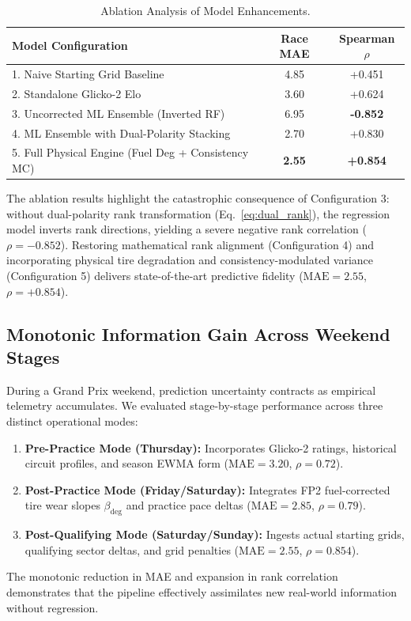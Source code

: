 \begin{table}[ht]
\centering
\caption{Ablation Analysis of Model Enhancements.}
\label{tab:ablation_study}
\begin{tabular}{lcc}
\toprule
\textbf{Model Configuration} & \textbf{Race MAE} & \textbf{Spearman $\rho$} \\
\midrule
1. Naive Starting Grid Baseline & 4.85 & +0.451 \\
2. Standalone Glicko-2 Elo & 3.60 & +0.624 \\
3. Uncorrected ML Ensemble (Inverted RF) & 6.95 & \textbf{-0.852} \\
4. ML Ensemble with Dual-Polarity Stacking & 2.70 & +0.830 \\
5. Full Physical Engine (Fuel Deg + Consistency MC) & \textbf{2.55} & \textbf{+0.854} \\
\bottomrule
\end{tabular}
\end{table}

The ablation results highlight the catastrophic consequence of Configuration 3: without dual-polarity rank transformation (Eq.~\eqref{eq:dual_rank}), the regression model inverts rank directions, yielding a severe negative rank correlation ($\rho = -0.852$). Restoring mathematical rank alignment (Configuration 4) and incorporating physical tire degradation and consistency-modulated variance (Configuration 5) delivers state-of-the-art predictive fidelity ($\text{MAE} = 2.55$, $\rho = +0.854$).

\subsection{Monotonic Information Gain Across Weekend Stages}
During a Grand Prix weekend, prediction uncertainty contracts as empirical telemetry accumulates. We evaluated stage-by-stage performance across three distinct operational modes:
\begin{enumerate}
    \item \textbf{Pre-Practice Mode (Thursday):} Incorporates Glicko-2 ratings, historical circuit profiles, and season EWMA form ($\text{MAE} = 3.20$, $\rho = 0.72$).
    \item \textbf{Post-Practice Mode (Friday/Saturday):} Integrates FP2 fuel-corrected tire wear slopes $\beta_{\text{deg}}$ and practice pace deltas ($\text{MAE} = 2.85$, $\rho = 0.79$).
    \item \textbf{Post-Qualifying Mode (Saturday/Sunday):} Ingests actual starting grids, qualifying sector deltas, and grid penalties ($\text{MAE} = 2.55$, $\rho = 0.854$).
\end{enumerate}
The monotonic reduction in MAE and expansion in rank correlation demonstrates that the pipeline effectively assimilates new real-world information without regression.
